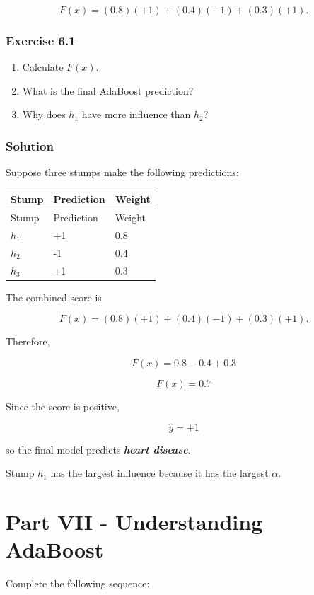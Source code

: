 \documentclass[10pt]{article}
\begin{document}
\[
F(x)
=
(0.8)(+1)+(0.4)(-1)+(0.3)(+1).
\]

\subsubsection*{Exercise 6.1}
\begin{enumerate}
\item
Calculate $F(x)$.

\item
What is the final AdaBoost prediction?

\item
Why does $h_1$ have more influence than $h_2$?

\end{enumerate}
\begingroup\color{red}

\subsubsection*{Solution}
Suppose three stumps make the following predictions:

\begingroup
\small
\setlength{\tabcolsep}{4pt}
\begin{longtable}{l|l|l}
Stump & Prediction & Weight \\[1.5pt]
\hline
\endfirsthead
Stump & Prediction & Weight \\[1.5pt]
\hline
\endhead
$h_1$ & +1 & 0.8 \\[1.5pt]
$h_2$ & -1 & 0.4 \\[1.5pt]
$h_3$ & +1 & 0.3 \\[1.5pt]
\end{longtable}
\endgroup
The combined score is

\[
F(x)
=
(0.8)(+1)
+
(0.4)(-1)
+
(0.3)(+1).
\]

Therefore,

\[
F(x)=0.8-0.4+0.3
\]

\[
{F(x)=0.7}
\]

Since the score is positive,

\[
{\hat y=+1}
\]

so the final model predicts \textbf{\textit{heart disease}}.

Stump $h_1$ has the largest influence because it has the largest $\alpha$.

\par\endgroup

\clearpage
\section*{Part VII - Understanding AdaBoost}
Complete the following sequence:
\end{document}
